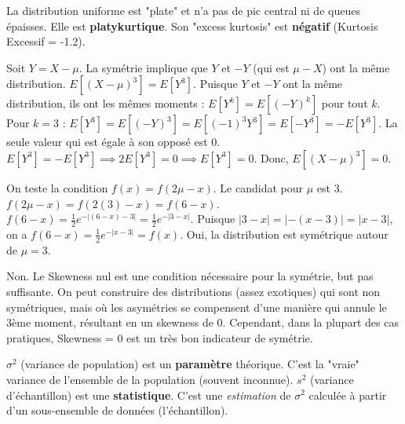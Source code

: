 \begin{correctionbox}
La distribution uniforme est "plate" et n'a pas de pic central ni de queues épaisses. Elle est \textbf{platykurtique}. Son "excess kurtosis" est \textbf{négatif} (Kurtosis Excessif = -1.2).
\end{correctionbox}

\begin{correctionbox}
Soit $Y = X - \mu$. La symétrie implique que $Y$ et $-Y$ (qui est $\mu - X$) ont la même distribution.
$E[(X-\mu)^3] = E[Y^3]$.
Puisque $Y$ et $-Y$ ont la même distribution, ils ont les mêmes moments : $E[Y^k] = E[(-Y)^k]$ pour tout $k$.
Pour $k=3$ :
$E[Y^3] = E[(-Y)^3] = E[(-1)^3 Y^3] = E[-Y^3] = -E[Y^3]$.
La seule valeur qui est égale à son opposé est 0.
$E[Y^3] = -E[Y^3] \implies 2 E[Y^3] = 0 \implies E[Y^3] = 0$.
Donc, $E[(X-\mu)^3] = 0$.
\end{correctionbox}

\begin{correctionbox}
On teste la condition $f(x) = f(2\mu - x)$. Le candidat pour $\mu$ est 3.
$f(2\mu - x) = f(2(3) - x) = f(6 - x)$.
$f(6 - x) = \frac{1}{2}e^{-|(6-x)-3|} = \frac{1}{2}e^{-|3-x|}$.
Puisque $|3-x| = |-(x-3)| = |x-3|$, on a $f(6-x) = \frac{1}{2}e^{-|x-3|} = f(x)$.
Oui, la distribution est symétrique autour de $\mu=3$.
\end{correctionbox}

\begin{correctionbox}
Non. Le Skewness nul est une condition nécessaire pour la symétrie, but pas suffisante.
On peut construire des distributions (assez exotiques) qui sont non symétriques, mais où les asymétries se compensent d'une manière qui annule le 3ème moment, résultant en un skewness de 0. Cependant, dans la plupart des cas pratiques, Skewness = 0 est un très bon indicateur de symétrie.
\end{correctionbox}

\begin{correctionbox}
$\sigma^2$ (variance de population) est un \textbf{paramètre} théorique. C'est la "vraie" variance de l'ensemble de la population (souvent inconnue).
$s^2$ (variance d'échantillon) est une \textbf{statistique}. C'est une \textit{estimation} de $\sigma^2$ calculée à partir d'un sous-ensemble de données (l'échantillon).
\end{correctionbox}

